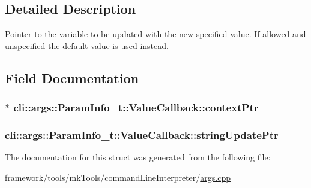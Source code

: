 \subsection{Detailed Description}
Pointer to the variable to be updated with the new specified value. If allowed and unspecified the default value is used instead. 

\subsection{Field Documentation}
\subsubsection[{\texorpdfstring{context\+Ptr}{contextPtr}}]{$\ast$ cli\+::args\+::\+Param\+Info\+\_\+t\+::\+Value\+Callback\+::context\+Ptr}\hypertarget{structcli_1_1args_1_1_param_info__t_1_1_value_callback_a2c4d109fe50b8c8f31fde7a891dd5159}{}\label{structcli_1_1args_1_1_param_info__t_1_1_value_callback_a2c4d109fe50b8c8f31fde7a891dd5159}
\subsubsection[{\texorpdfstring{string\+Update\+Ptr}{stringUpdatePtr}}]{ cli\+::args\+::\+Param\+Info\+\_\+t\+::\+Value\+Callback\+::string\+Update\+Ptr}\hypertarget{structcli_1_1args_1_1_param_info__t_1_1_value_callback_a616a10b233e192d579ec3f4d8ec4fa82}{}\label{structcli_1_1args_1_1_param_info__t_1_1_value_callback_a616a10b233e192d579ec3f4d8ec4fa82}


The documentation for this struct was generated from the following file\+:\begin{DoxyCompactItemize}
\item 
framework/tools/mk\+Tools/command\+Line\+Interpreter/\hyperlink{args_8cpp}{args.\+cpp}\end{DoxyCompactItemize}

